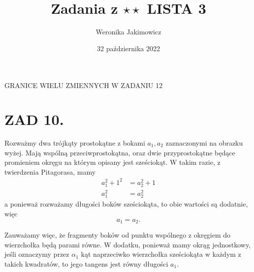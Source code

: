 \documentclass{article}[13pt]
\author{Weronika Jakimowicz}
\title{Zadania z $\star\star$ LISTA 3}
\date{32 października 2022}
\begin{document}
    \maketitle

    {\color{blue}GRANICE WIELU ZMIENNYCH W ZADANIU 12}

    \section*{ZAD 10.}

    \begin{center}
    \end{center}

    Rozważmy dwa trójkąty prostokątne z bokami $a_1,a_2$ zaznaczonymi na obrazku wyżej. Mają wspólną przeciwprostokątna, oraz dwie przyprostokątne będące promieniem okręgu na którym opisany jest sześciokąt. W takim razie, z twierdzenia Pitagorasa, mamy
    \begin{align*}
        a_1^2+1^2&=a_2^2+1\\
        a_1^2&=a^2_2
    \end{align*}
    a ponieważ rozważamy długości boków sześciokąta, to obie wartości są dodatnie, więc
    $$a_1=a_2.$$

    Zauważamy więc, że fragmenty boków od punktu wspólnego z okręgiem do wierzchołka będą parami równe. W dodatku, ponieważ mamy okrąg jednostkowy, jeśli oznaczymy przez $\alpha_1$ kąt naprzeciwko wierzchołka sześciokąta w każdym z takich kwadratów, to jego tangens jest równy długości $a_1$.
\end{document}
